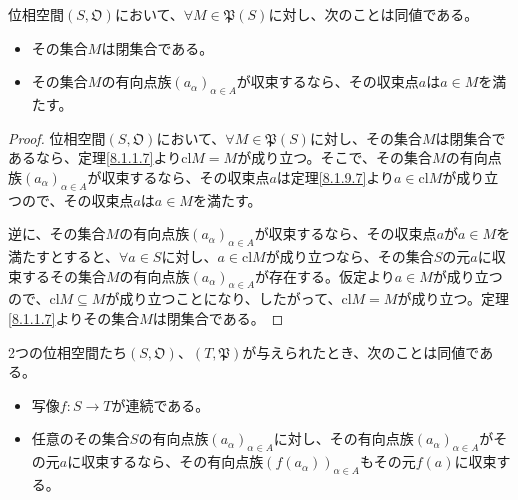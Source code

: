 \documentclass[dvipdfmx]{jsarticle}
\begin{document}
\begin{thm}\label{8.1.9.8}
位相空間$\left( S,\mathfrak{O} \right)$において、$\forall M \in \mathfrak{P}(S)$に対し、次のことは同値である。
\begin{itemize}
\item
  その集合$M$は閉集合である。
\item
  その集合$M$の有向点族$\left( a_{\alpha} \right)_{\alpha \in A}$が収束するなら、その収束点$a$は$a \in M$を満たす。
\end{itemize}
\end{thm}
\begin{proof}
位相空間$\left( S,\mathfrak{O} \right)$において、$\forall M \in \mathfrak{P}(S)$に対し、その集合$M$は閉集合であるなら、定理\ref{8.1.1.7}より${\mathrm{cl}}M = M$が成り立つ。そこで、その集合$M$の有向点族$\left( a_{\alpha} \right)_{\alpha \in A}$が収束するなら、その収束点$a$は定理\ref{8.1.9.7}より$a \in {\mathrm{cl}}M$が成り立つので、その収束点$a$は$a \in M$を満たす。\par
逆に、その集合$M$の有向点族$\left( a_{\alpha} \right)_{\alpha \in A}$が収束するなら、その収束点$a$が$a \in M$を満たすとすると、$\forall a \in S$に対し、$a \in {\mathrm{cl}}M$が成り立つなら、その集合$S$の元$a$に収束するその集合$M$の有向点族$\left( a_{\alpha} \right)_{\alpha \in A}$が存在する。仮定より$a \in M$が成り立つので、${\mathrm{cl}}M \subseteq M$が成り立つことになり、したがって、${\mathrm{cl}}M = M$が成り立つ。定理\ref{8.1.1.7}よりその集合$M$は閉集合である。
\end{proof}
\begin{thm}\label{8.1.9.9}
2つの位相空間たち$\left( S,\mathfrak{O} \right)$、$\left( T,\mathfrak{P} \right)$が与えられたとき、次のことは同値である。
\begin{itemize}
\item
  写像$f:S \rightarrow T$が連続である。
\item
  任意のその集合$S$の有向点族$\left( a_{\alpha} \right)_{\alpha \in A}$に対し、その有向点族$\left( a_{\alpha} \right)_{\alpha \in A}$がその元$a$に収束するなら、その有向点族$\left( f\left( a_{\alpha} \right) \right)_{\alpha \in A}$もその元$f(a)$に収束する。
\end{itemize}
\end{thm}
\end{document}

